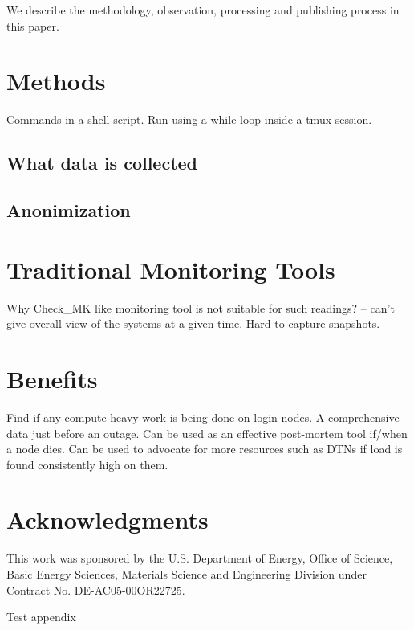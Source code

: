 \documentclass[sigconf]{acmart}
\begin{document}
We describe the methodology, observation, processing and publishing process in this paper.

\section{Methods}
Commands in a shell script. Run using a while loop inside a tmux session.
\subsection{What data is collected}

\subsection{Anonimization}

\section{Traditional Monitoring Tools}
Why Check\_MK like monitoring tool is not suitable for such readings? -- can't
give overall view of the systems at a given time. Hard to capture snapshots.

\section{Benefits}
Find if any compute heavy work is being done on login nodes.
A comprehensive data just before an outage.
Can be used as an effective post-mortem tool if/when a node dies.
Can be used to advocate for more resources such as DTNs if load is found consistently high on them.

\section{Acknowledgments}
This work was sponsored by the U.S. Department of Energy, Office of Science,
Basic Energy Sciences, Materials Science and Engineering Division under
Contract No. DE-AC05-00OR22725.




\appendix
Test appendix
\end{document}
